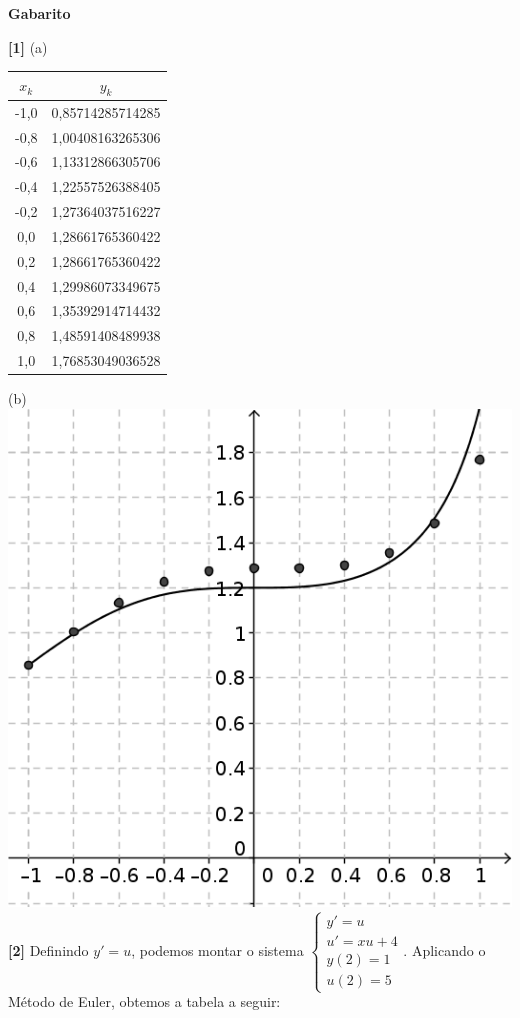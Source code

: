 \documentclass[10pt,a4paper]{article}
\begin{document}
\begin{center}
\textbf{Gabarito}
\end{center} 
\textbf{[1]} (a)
\begin{tabular}{c|c}
$x_k$ & $y_k$ \\ \hline
-1,0 & 0,85714285714285 \\ \hline
-0,8 & 1,00408163265306 \\ \hline
-0,6 & 1,13312866305706 \\ \hline
-0,4 & 1,22557526388405 \\  \hline
-0,2 & 1,27364037516227 \\ \hline
0,0 & 1,28661765360422 \\ \hline
0,2 & 1,28661765360422 \\ \hline
0,4 & 1,29986073349675 \\ \hline
0,6 & 1,35392914714432 \\ \hline
0,8 & 1,48591408489938 \\ \hline
1,0 & 1,76853049036528
\end{tabular} 
(b) %
      \includegraphics[scale=1]{imagem/figura1_listaxi.png}
\textbf{[2]} Definindo $y' = u$, podemos montar o sistema $\begin{cases}y' = u \\ u' = xu + 4 \\ y(2) = 1 \\ u(2) = 5\end{cases}$. Aplicando o Método de Euler, obtemos a tabela a seguir: 
\end{document}
